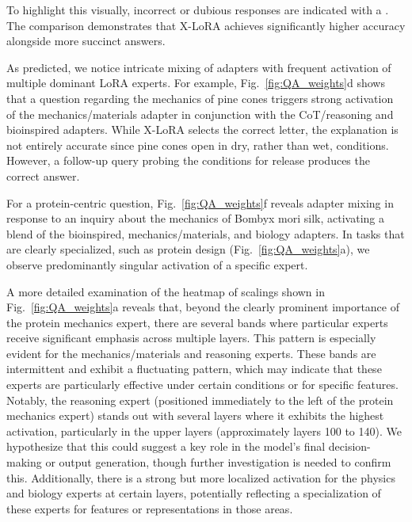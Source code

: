 To highlight this visually, incorrect or dubious responses are indicated with a . The comparison demonstrates that X-LoRA achieves significantly higher accuracy alongside more succinct answers.

As predicted, we notice intricate mixing of adapters with frequent activation of multiple dominant LoRA experts. For example, Fig.~\ref{fig:QA_weights}d shows that a question regarding the mechanics of pine cones triggers strong activation of the mechanics/materials adapter in conjunction with the CoT/reasoning and bioinspired adapters. While X-LoRA selects the correct letter, the explanation is not entirely accurate since pine cones open in dry, rather than wet, conditions. However, a follow-up query probing the conditions for release produces the correct answer.

For a protein-centric question, Fig.~\ref{fig:QA_weights}f reveals adapter mixing in response to an inquiry about the mechanics of Bombyx mori silk, activating a blend of the bioinspired, mechanics/materials, and biology adapters. In tasks that are clearly specialized, such as protein design (Fig.~\ref{fig:QA_weights}a), we observe predominantly singular activation of a specific expert.

A more detailed examination of the heatmap of scalings shown in Fig.~\ref{fig:QA_weights}a reveals that, beyond the clearly prominent importance of the protein mechanics expert, there are several bands where particular experts receive significant emphasis across multiple layers. This pattern is especially evident for the mechanics/materials and reasoning experts. These bands are intermittent and exhibit a fluctuating pattern, which may indicate that these experts are particularly effective under certain conditions or for specific features. Notably, the reasoning expert (positioned immediately to the left of the protein mechanics expert) stands out with several layers where it exhibits the highest activation, particularly in the upper layers (approximately layers 100 to 140). We hypothesize that this could suggest a key role in the model's final decision-making or output generation, though further investigation is needed to confirm this. Additionally, there is a strong but more localized activation for the physics and biology experts at certain layers, potentially reflecting a specialization of these experts for features or representations in those areas.

